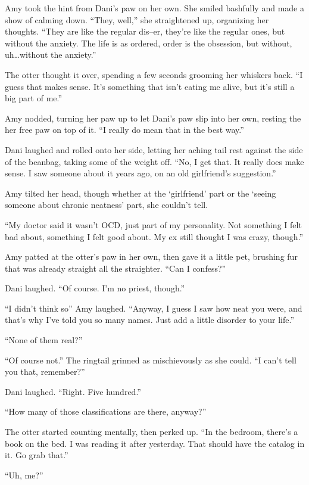 Amy took the hint from Dani's paw on her own. She smiled bashfully and made a show of calming down. ``They, well,'' she straightened up, organizing her thoughts. ``They are like the regular dis--er, they're like the regular ones, but without the anxiety. The life is as ordered, order is the obsession, but without, uh\ldots{}without the anxiety.''

The otter thought it over, spending a few seconds grooming her whiskers back. ``I guess that makes sense. It's something that isn't eating me alive, but it's still a big part of me.''

Amy nodded, turning her paw up to let Dani's paw slip into her own, resting the her free paw on top of it. ``I really do mean that in the best way.''

Dani laughed and rolled onto her side, letting her aching tail rest against the side of the beanbag, taking some of the weight off. ``No, I get that. It really does make sense. I saw someone about it years ago, on an old girlfriend's suggestion.''

Amy tilted her head, though whether at the `girlfriend' part or the `seeing someone about chronic neatness' part, she couldn't tell.

``My doctor said it wasn't OCD, just part of my personality. Not something I felt bad about, something I felt good about. My ex still thought I was crazy, though.''

Amy patted at the otter's paw in her own, then gave it a little pet, brushing fur that was already straight all the straighter. ``Can I confess?''

Dani laughed. ``Of course. I'm no priest, though.''

``I didn't think so'' Amy laughed. ``Anyway, I guess I saw how neat you were, and that's why I've told you so many names. Just add a little disorder to your life.''

``None of them real?''

``Of course not.'' The ringtail grinned as mischievously as she could. ``I can't tell you that, remember?''

Dani laughed. ``Right. Five hundred.''

``How many of those classifications are there, anyway?''

The otter started counting mentally, then perked up. ``In the bedroom, there's a book on the bed. I was reading it after yesterday. That should have the catalog in it. Go grab that.''

``Uh, me?''

